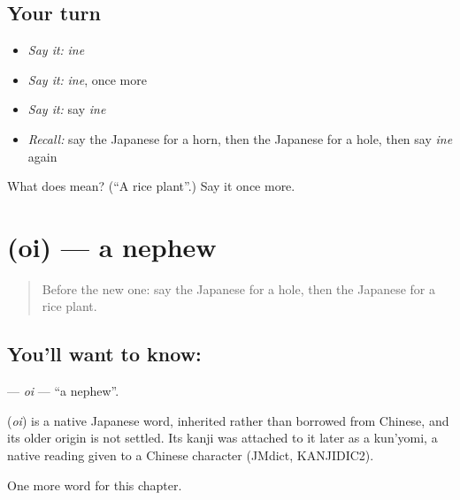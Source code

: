\subsection*{Your turn}
\begin{itemize}
\raggedright
  \item \emph{Say it:} \emph{ine}
  \item \emph{Say it:} \emph{ine}, once more
  \item \emph{Say it:} say \emph{ine}
  \item \emph{Recall:} say the Japanese for a horn, then the Japanese for a hole, then say \emph{ine} again
\end{itemize}

\begin{tcolorbox}[breakable,colback=teal!4,colframe=teal!35!black,title={Before you move on}]
What does  mean? (\textquotedblleft{}A rice plant\textquotedblright{}.) Say it once more.
\end{tcolorbox}
\section[\texorpdfstring{\ja{おい} (oi)}{おい (oi)}]{ (oi) — a nephew}

\label{lesson:JA-C71-oi}



\begin{quote}
Before the new one: say the Japanese for a hole, then the Japanese for a rice plant.
\end{quote}

\subsection*{You'll want to know: }
\textbf{} — \emph{oi} — \textquotedblleft{}a nephew\textquotedblright{}.

\begin{cousinweb}
\textbf{} (\emph{oi}) is a native Japanese word, inherited rather than borrowed from Chinese, and its older origin is not settled. Its kanji was attached to it later as a kun'yomi, a native reading given to a Chinese character (JMdict, KANJIDIC2).
\end{cousinweb}

\begin{grammarlens}[title={What you've built}]
One more word for this chapter.
\end{grammarlens}

